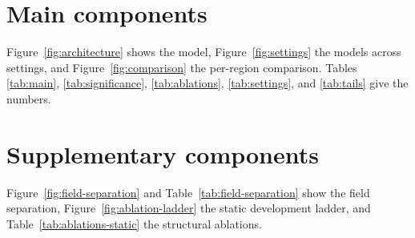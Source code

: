 \documentclass[10pt,twocolumn]{article}
\begin{document}

\section{Main components}
Figure~\ref{fig:architecture} shows the model, Figure~\ref{fig:settings} the
models across settings, and Figure~\ref{fig:comparison} the per-region
comparison. Tables \ref{tab:main}, \ref{tab:significance}, \ref{tab:ablations},
\ref{tab:settings}, and \ref{tab:tails} give the numbers.

\section{Supplementary components}
Figure~\ref{fig:field-separation} and Table~\ref{tab:field-separation} show the
field separation, Figure~\ref{fig:ablation-ladder} the static development
ladder, and Table~\ref{tab:ablations-static} the structural ablations.






\clearpage


\clearpage




\end{document}
